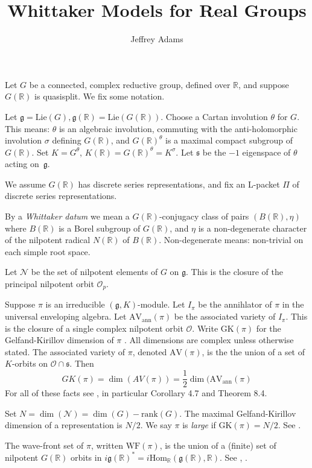 \documentclass[10pt,leqno]{article}
\newcommand{\Hom}{\mathrm{Hom}}
\renewcommand{\O}{\mathcal O}
\newcommand{\R}{\mathbb R}
\newcommand{\N}{\mathcal N}
\newcommand{\Lie}{\mathrm{Lie}}
\newcommand{\g}{\mathfrak g}
\newcommand{\s}{\mathfrak s}
\newcommand{\AV}{\mathrm{AV}}
\newcommand{\WF}{\mathrm{WF}}
\newcommand{\AVann}{\mathrm{AV}_{\mathrm{ann}}}
\newcommand{\GK}{\mathrm{GK}}
\newcommand{\Op}{\O_p}
\begin{document}
\title{Whittaker Models for Real Groups}
\author{Jeffrey Adams}
\maketitle

Let $G$ be a connected, complex reductive group, defined over $\R$, and suppose $G(\R)$ is quasisplit.
We fix some notation.

Let $\g=\Lie(G), \g(\R)=\Lie(G(\R))$. Choose a Cartan involution $\theta$ for $G$. This means:
$\theta$ is an algebraic involution, commuting with the anti-holomorphic involution $\sigma$ defining $G(\R)$,
and $G(\R)^\theta$ is a maximal compact subgroup of $G(\R)$. Set $K=G^\theta$, $K(\R)=G(\R)^\theta=K^\sigma$.
Let $\s$ be the $-1$ eigenspace of $\theta$ acting on~$\g$.

We assume $G(\R)$ has discrete series representations, and fix an L-packet $\Pi$ of discrete series representations.

By a  {\it Whittaker datum} we mean a $G(\R)$-conjugacy class of pairs  $(B(\R),\eta)$ where $B(\R)$ is a
Borel subgroup of $G(\R)$, 
and $\eta$ is a non-degenerate character of the nilpotent radical $N(\R)$ of $B(\R)$. Non-degenerate means: non-trivial on each simple root space.


Let $\N$ be the set of nilpotent elements of $G$ on $\g$.
This is the closure of the principal nilpotent orbit $\Op$.

Suppose $\pi$ is an irreducible $(\g,K)$-module. Let $I_\pi$ be the annihlator of $\pi$ in the universal enveloping algebra.
Let $\AVann(\pi)$ be the associated variety of $I_\pi$. 
This is the closure of a single complex nilpotent orbit $\O$.
Write $\GK(\pi)$ for the Gelfand-Kirillov dimension of $\pi$
\cite{vogan-gelfand-kirillov}. 
All dimensions are complex unless otherwise stated.
The associated variety of $\pi$, denoted $\AV(\pi)$, is the  the union of a set of
$K$-orbits on $\O\cap\s$.
Then
$$
GK(\pi)=\dim(AV(\pi))=\frac12\dim(\AVann(\pi)
$$
For all of these facts see \cite{vogan_bowdoin}, in particular Corollary 4.7 and Theorem 8.4.

Set $N=\dim(\N)=\dim(G)-\mathrm{rank}(G)$. The maximal Gelfand-Kirillov dimension of a representation is $N/2$.
We say $\pi$ is {\it large} if $\GK(\pi)=N/2$. See \cite[Section 6]{Vogan78}.


The wave-front set of $\pi$, written $\WF(\pi)$, is the union of a (finite) set of nilpotent $G(\R)$ orbits in
$i\g(\R)^*=i\Hom_\R(\g(\R),\R)$. See \cite{howe_wave_front}, \cite{bv_local_structure}.
\end{document}
